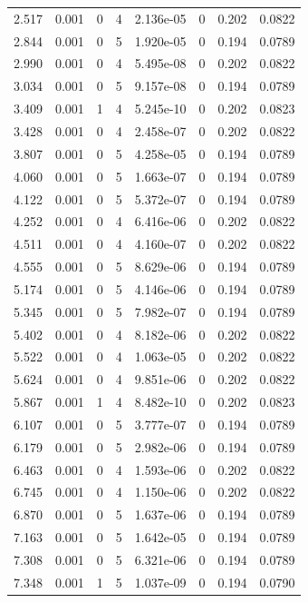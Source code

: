 \documentclass[preview]{standalone}
\begin{document}
{{\begin{tabular}{L{1.2cm}C{1.2cm} C{0.3cm}C{0.5cm} C{1.4cm}C{1.4cm} C{1.4cm}C{1.4cm}}
  2.517  &  0.001  & 0     &  4 &  2.136e-05  & 0  & 0.202 &  0.0822   \\ 
  2.844  &  0.001  & 0     &  5 &  1.920e-05  & 0  & 0.194 &  0.0789   \\ 
  2.990  &  0.001  & 0     &  4 &  5.495e-08  & 0  & 0.202 &  0.0822   \\ 
  3.034  &  0.001  & 0     &  5 &  9.157e-08  & 0  & 0.194 &  0.0789   \\ 
  3.409  &  0.001  & 1     &  4 &  5.245e-10  & 0  & 0.202 &  0.0823   \\ 
  3.428  &  0.001  & 0     &  4 &  2.458e-07  & 0  & 0.202 &  0.0822   \\ 
  3.807  &  0.001  & 0     &  5 &  4.258e-05  & 0  & 0.194 &  0.0789   \\ 
  4.060  &  0.001  & 0     &  5 &  1.663e-07  & 0  & 0.194 &  0.0789   \\ 
  4.122  &  0.001  & 0     &  5 &  5.372e-07  & 0  & 0.194 &  0.0789   \\ 
  4.252  &  0.001  & 0     &  4 &  6.416e-06  & 0  & 0.202 &  0.0822   \\ 
  4.511  &  0.001  & 0     &  4 &  4.160e-07  & 0  & 0.202 &  0.0822   \\ 
  4.555  &  0.001  & 0     &  5 &  8.629e-06  & 0  & 0.194 &  0.0789   \\ 
  5.174  &  0.001  & 0     &  5 &  4.146e-06  & 0  & 0.194 &  0.0789   \\ 
  5.345  &  0.001  & 0     &  5 &  7.982e-07  & 0  & 0.194 &  0.0789   \\ 
  5.402  &  0.001  & 0     &  4 &  8.182e-06  & 0  & 0.202 &  0.0822   \\ 
  5.522  &  0.001  & 0     &  4 &  1.063e-05  & 0  & 0.202 &  0.0822   \\ 
  5.624  &  0.001  & 0     &  4 &  9.851e-06  & 0  & 0.202 &  0.0822   \\ 
  5.867  &  0.001  & 1     &  4 &  8.482e-10  & 0  & 0.202 &  0.0823   \\ 
  6.107  &  0.001  & 0     &  5 &  3.777e-07  & 0  & 0.194 &  0.0789   \\ 
  6.179  &  0.001  & 0     &  5 &  2.982e-06  & 0  & 0.194 &  0.0789   \\ 
  6.463  &  0.001  & 0     &  4 &  1.593e-06  & 0  & 0.202 &  0.0822   \\ 
  6.745  &  0.001  & 0     &  4 &  1.150e-06  & 0  & 0.202 &  0.0822   \\ 
  6.870  &  0.001  & 0     &  5 &  1.637e-06  & 0  & 0.194 &  0.0789   \\ 
  7.163  &  0.001  & 0     &  5 &  1.642e-05  & 0  & 0.194 &  0.0789   \\ 
  7.308  &  0.001  & 0     &  5 &  6.321e-06  & 0  & 0.194 &  0.0789   \\ 
  7.348  &  0.001  & 1     &  5 &  1.037e-09  & 0  & 0.194 &  0.0790   \\ 
\hline 
\end{tabular} 

}}
\end{document}

